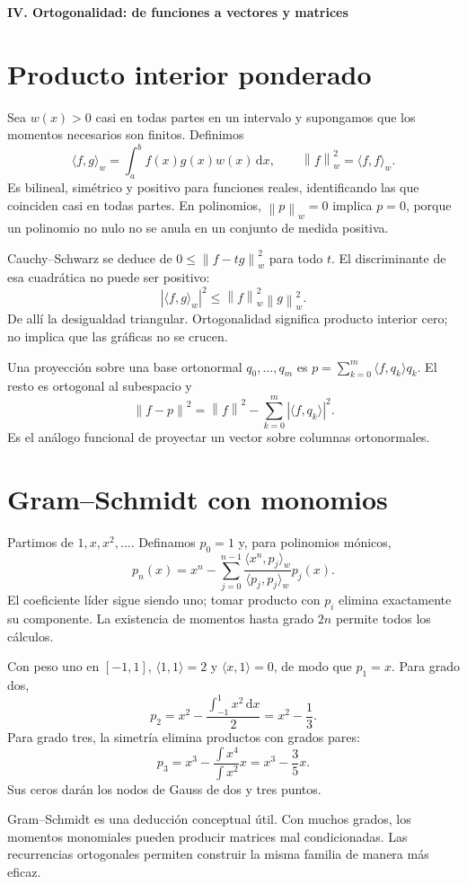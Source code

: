 \documentclass[11pt,a4paper]{article}
\newcommand{\dd}{\,\mathrm d}
\newcommand{\norm}[1]{\left\lVert #1\right\rVert}
\theoremstyle{definition}
\newcommand{\parte}[1]{\par\bigskip\Needspace{8\baselineskip}\begin{center}{\Large\bfseries\color{azul}#1}\end{center}}
\begin{document}
\parte{IV. Ortogonalidad: de funciones a vectores y matrices}
\section{Producto interior ponderado}
Sea $w(x)>0$ casi en todas partes en un intervalo y supongamos que los momentos necesarios son finitos. Definimos
\[
\langle f,g\rangle_w=\int_a^b f(x)g(x)w(x)\dd x,\qquad
\norm f_w^2=\langle f,f\rangle_w.
\]
Es bilineal, simétrico y positivo para funciones reales, identificando las que coinciden casi en todas partes. En polinomios, $\norm p_w=0$ implica $p=0$, porque un polinomio no nulo no se anula en un conjunto de medida positiva.

Cauchy--Schwarz se deduce de $0\le\norm{f-tg}_w^2$ para todo $t$. El discriminante de esa cuadrática no puede ser positivo:
\[
|\langle f,g\rangle_w|^2\le\norm f_w^2\norm g_w^2.
\]
De allí la desigualdad triangular. Ortogonalidad significa producto interior cero; no implica que las gráficas no se crucen.

Una proyección sobre una base ortonormal $q_0,\ldots,q_m$ es
$p=\sum_{k=0}^m\langle f,q_k\rangle q_k$. El resto es ortogonal al subespacio y
\[
\norm{f-p}^2=\norm f^2-\sum_{k=0}^m|\langle f,q_k\rangle|^2.
\]
Es el análogo funcional de proyectar un vector sobre columnas ortonormales.

\section{Gram--Schmidt con monomios}
Partimos de $1,x,x^2,\ldots$. Definamos $p_0=1$ y, para polinomios mónicos,
\[
p_n(x)=x^n-\sum_{j=0}^{n-1}
\frac{\langle x^n,p_j\rangle_w}{\langle p_j,p_j\rangle_w}p_j(x).
\]
El coeficiente líder sigue siendo uno; tomar producto con $p_i$ elimina exactamente su componente. La existencia de momentos hasta grado $2n$ permite todos los cálculos.

Con peso uno en $[-1,1]$, $\langle1,1\rangle=2$ y $\langle x,1\rangle=0$, de modo que $p_1=x$. Para grado dos,
\[
p_2=x^2-\frac{\int_{-1}^1x^2\dd x}{2}=x^2-\frac13.
\]
Para grado tres, la simetría elimina productos con grados pares:
\[
p_3=x^3-\frac{\int x^4}{\int x^2}x=x^3-\frac35x.
\]
Sus ceros darán los nodos de Gauss de dos y tres puntos.

Gram--Schmidt es una deducción conceptual útil. Con muchos grados, los momentos monomiales pueden producir matrices mal condicionadas. Las recurrencias ortogonales permiten construir la misma familia de manera más eficaz.
\end{document}

